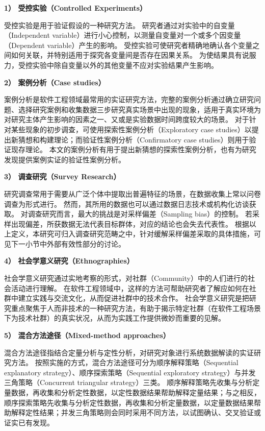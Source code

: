 \textbf{1） 受控实验（Controlled Experiments）}

受控实验是用于验证假设的一种研究方法。
研究者通过对实验中的自变量（Independent variable）进行小心控制，以测量自变量对一个或多个因变量（Dependent variable）产生的影响。
受控实验可使研究者精确地确认各个变量之间如何关联，并特别适用于探究各变量间是否存在因果关系。
为使结果具有说服力，受控实验中除自变量以外的其他变量不应对实验结果产生影响。

\textbf{2） 案例分析（Case studies）}

案例分析是软件工程领域最常用的实证研究方法，完整的案例分析通过确立研究问题、选择研究案例和收集数据三步研究真实场景中出现的现象，适用于真实环境为对研究主体产生影响的因素之一、又或是实验数据时间跨度较大的场景。
对于针对某些现象的初步调查，可使用探索性案例分析（Exploratory case studies）以提出新猜想和构建理论；而验证性案例分析（Confirmatory case studies）则用于验证现存理论。
本文的案例分析有用于提出新猜想的探索性案例分析，也有为研究发现提供案例实证的验证性案例分析。

\textbf{3） 调查研究（Survey Research）}

研究调查常用于需要从广泛个体中提取出普遍特征的场景，在数据收集上常以问卷调查为形式进行。
然而，其所用的数据也可以通过数据日志技术或机构化访谈获取。
对调查研究而言，最大的挑战是对采样偏差（Sampling bias）的控制。
若采样出现偏差，所获数据无法代表目标群体，对应的结论也会失去代表性。
根据以上定义，本研究可归入调查研究范畴之中，针对缓解采样偏差采取的具体措施，可见下一小节中外部有效性部分的讨论。

\textbf{4） 社会学意义研究（Ethnographies）}

社会学意义研究通过实地考察的形式，对社群（Community）中的人们进行的社会活动进行理解。
在软件工程领域中，这样的方法可帮助研究者了解应如何在社群中建立实践与交流文化，从而促进社群中的技术合作。
社会学意义研究是把研究重点聚焦于人而非技术的一种研究方法，有助于揭示特定社群（在软件工程场景下为技术社群）的真实状况，从而为实践工作提供微妙而重要的见解。

\textbf{5） 混合方法途径（Mixed-method approaches）}

混合方法途径指结合定量分析与定性分析，对研究对象进行系统数据解读的实证研究方法。
按照实施的方式，混合方法途径可分为顺序解释策略（Sequential explanatory strategy）、顺序探索策略（Sequential exploratory strategy）与并发三角策略（Concurrent triangular strategy）三类。
顺序解释策略先收集与分析定量数据，再收集和分析定性数据，以定性数据结果帮助解释定量结果；与之相反，顺序探索策略先收集与分析定性数据，再收集和分析定量数据，以定量数据结果帮助解释定性结果；并发三角策略则会同时采用不同方法，以试图确认、交叉验证或证实已有发现。


